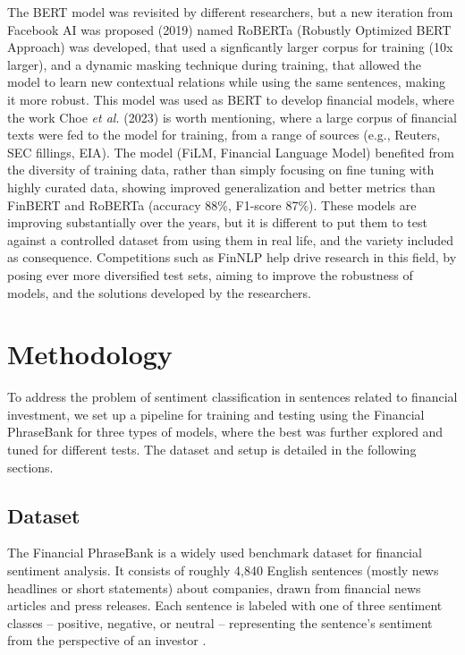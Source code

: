 \documentclass[conference]{IEEEtran}
\begin{document}
The BERT model was revisited by different researchers, but a new iteration from Facebook AI was proposed (2019) named RoBERTa (Robustly Optimized BERT Approach) was developed, that used a signficantly larger corpus for training (10x larger), and a dynamic masking technique during training, that allowed the model to learn new contextual relations while using the same sentences, making it more robust. This model was used as BERT to develop financial models, where the work Choe \textit{et al.} (2023) is worth mentioning, where a large corpus of financial texts were fed to the model for training, from a range of sources (e.g., Reuters, SEC fillings, EIA). The model (FiLM, Financial Language Model) benefited from the diversity of training data, rather than simply focusing on fine tuning with highly curated data, showing improved generalization and better metrics than FinBERT and RoBERTa (accuracy 88\%, F1-score 87\%). These models are improving substantially over the years, but it is different to put them to test against a controlled dataset from using them in real life, and the variety included as consequence. Competitions such as FinNLP help drive research in this field, by posing ever more diversified test sets, aiming to improve the robustness of models, and the solutions developed by the researchers.


\section{Methodology}

To address the problem of sentiment classification in sentences related to financial investment, we set up a pipeline for training and testing using the Financial PhraseBank for three types of models, where the best was further explored and tuned for different tests. The dataset and setup is detailed in the following sections.

\subsection{Dataset}

The Financial PhraseBank is a widely used benchmark dataset for financial sentiment analysis. It consists of roughly 4,840 English sentences (mostly news headlines or short statements) about companies, drawn from financial news articles and press releases. Each sentence is labeled with one of three sentiment classes – positive, negative, or neutral – representing the sentence’s sentiment from the perspective of an investor \cite{dataset, malo2013gooddebtbaddebt}.
\end{document}
